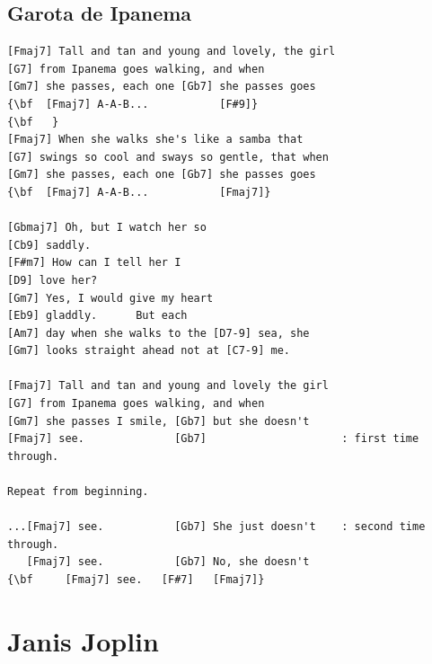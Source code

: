 \documentclass[a4paper]{article}
\begin{document}
\subsection{Garota de Ipanema}
\begin{Verbatim}[commandchars=\\\{\}]
[Fmaj7] Tall and tan and young and lovely, the girl
[G7] from Ipanema goes walking, and when
[Gm7] she passes, each one [Gb7] she passes goes
{\bf  [Fmaj7] A-A-B...           [F#9]}
{\bf   }
[Fmaj7] When she walks she's like a samba that
[G7] swings so cool and sways so gentle, that when
[Gm7] she passes, each one [Gb7] she passes goes
{\bf  [Fmaj7] A-A-B...           [Fmaj7]}

[Gbmaj7] Oh, but I watch her so
[Cb9] saddly.
[F#m7] How can I tell her I
[D9] love her?
[Gm7] Yes, I would give my heart
[Eb9] gladdly.      But each
[Am7] day when she walks to the [D7-9] sea, she
[Gm7] looks straight ahead not at [C7-9] me.

[Fmaj7] Tall and tan and young and lovely the girl
[G7] from Ipanema goes walking, and when
[Gm7] she passes I smile, [Gb7] but she doesn't
[Fmaj7] see.              [Gb7]                     : first time through.

Repeat from beginning.

...[Fmaj7] see.           [Gb7] She just doesn't    : second time through.
   [Fmaj7] see.           [Gb7] No, she doesn't
{\bf     [Fmaj7] see.   [F#7]   [Fmaj7]}

\end{Verbatim}
\newpage
\section{Janis Joplin}
\end{document}
